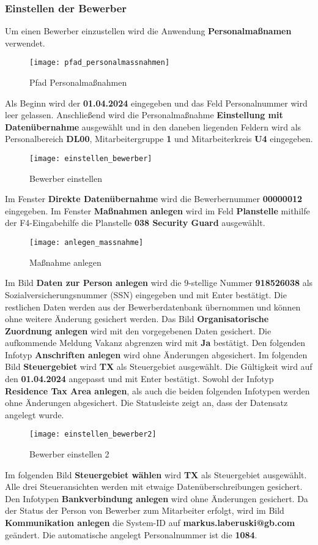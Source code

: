 \subsubsection{Einstellen der Bewerber}
Um einen Bewerber einzustellen wird die Anwendung \textbf{Personalmaßnamen} verwendet.
\begin{figure}[H]
	\centering
	\texttt{[image: pfad\_personalmassnahmen]}
	\caption{Pfad Personalmaßnahmen}
	\label{fig:pfad_personalmassnahmen2}
\end{figure}
Als Beginn wird der \textbf{01.04.2024} eingegeben und das Feld Personalnummer wird leer gelassen. Anschließend wird die Personalmaßnahme \textbf{Einstellung mit Datenübernahme} ausgewählt und in den daneben liegenden Feldern wird als Personalbereich \textbf{DL00}, Mitarbeitergruppe \textbf{1} und Mitarbeiterkreis \textbf{U4} eingegeben.
\begin{figure}[H]
	\centering
	\texttt{[image: einstellen\_bewerber]}
	\caption{Bewerber einstellen}
	\label{fig:einstellen_bewerber}
\end{figure}
Im Fenster \textbf{Direkte Datenübernahme} wird die Bewerbernummer \textbf{00000012} eingegeben. Im Fenster \textbf{Maßnahmen anlegen} wird im Feld \textbf{Planstelle} mithilfe der F4-Eingabehilfe die Planstelle \textbf{038 Security Guard} ausgewählt.
\begin{figure}[H]
	\centering
	\texttt{[image: anlegen\_massnahme]}
	\caption{Maßnahme anlegen}
	\label{fig:anlegen_massnahme}
\end{figure}
Im Bild \textbf{Daten zur Person anlegen} wird die 9-stellige Nummer \textbf{918526038} als Sozialversicherungsnummer (SSN) eingegeben und mit Enter bestätigt. Die restlichen Daten werden aus der Bewerberdatenbank übernommen und können ohne weitere Änderung gesichert werden. Das Bild \textbf{Organisatorische Zuordnung anlegen} wird mit den vorgegebenen Daten gesichert. Die aufkommende Meldung Vakanz abgrenzen wird mit \textbf{Ja} bestätigt. Den folgenden Infotyp \textbf{Anschriften anlegen} wird ohne Änderungen abgesichert. Im folgenden Bild \textbf{Steuergebiet} wird \textbf{TX} als Steuergebiet ausgewählt. Die Gültigkeit wird auf den \textbf{01.04.2024} angepasst und mit Enter bestätigt. Sowohl der Infotyp \textbf{Residence Tax Area anlegen}, als auch die beiden folgenden Infotypen werden ohne Änderungen abgesichert. Die Statusleiste zeigt an, dass der Datensatz angelegt wurde.
\begin{figure}[H]
	\centering
	\texttt{[image: einstellen\_bewerber2]}
	\caption{Bewerber einstellen 2}
	\label{fig:einstellen_bewerber2}
\end{figure}
Im folgenden Bild \textbf{Steuergebiet wählen} wird \textbf{TX} als Steuergebiet ausgewählt. Alle drei Steueransichten werden mit etwaige Datenüberschreibungen gesichert. Den Infotypen \textbf{Bankverbindung anlegen} wird ohne Änderungen gesichert. Da der Status der Person von Bewerber zum Mitarbeiter erfolgt, wird im Bild \textbf{Kommunikation anlegen} die System-ID auf \textbf{markus.laberuski@gb.com} geändert. Die automatische angelegt Personalnummer ist die \textbf{1084}.


